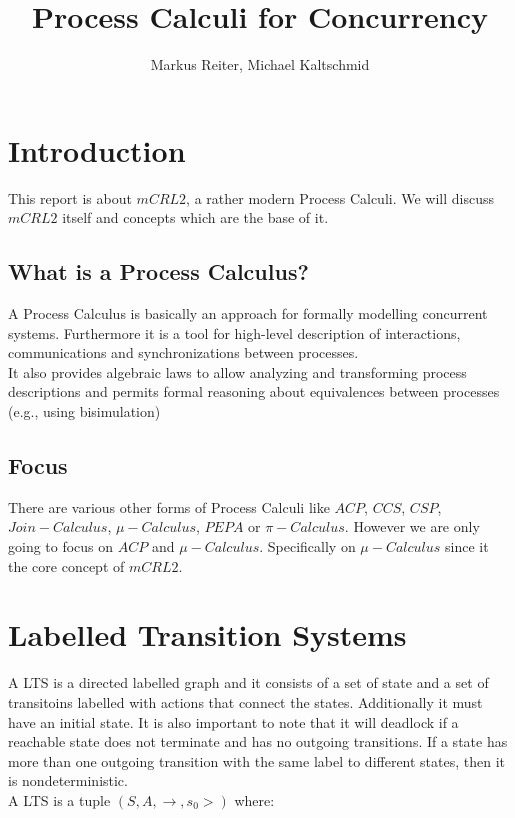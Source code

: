 \documentclass{clseminar}
\title{Process Calculi for Concurrency}
\author{Markus Reiter, Michael Kaltschmid}
\begin{document}
  \abstract{}
  \maketitle
  \tableofcontents

  \section{Introduction}
  This report is about $mCRL2$, a rather modern Process Calculi. We will discuss $mCRL2$ itself and concepts which are the base of it.
  \subsection{What is a Process Calculus?}
  A Process Calculus is basically an approach for formally modelling concurrent systems.
  Furthermore it is a tool for high-level description of interactions, communications and synchronizations between processes. \\
  It also provides algebraic laws to allow analyzing and transforming process descriptions and permits formal reasoning about equivalences between processes (e.g., using bisimulation) \\

  \subsection{Focus}
  There are various other forms of Process Calculi like $ACP$, $CCS$, $CSP$, $Join-Calculus$, $\mu-Calculus$, $PEPA$ or $\pi-Calculus$. However we are only going to focus on $ACP$ and $\mu-Calculus$. Specifically on $\mu-Calculus$ since it the core concept of $mCRL2$.

  \section{Labelled Transition Systems}
  A LTS is a directed labelled graph and it consists of a set of state and a set of transitoins labelled with actions that connect the states. Additionally it must have an initial state. It is also important to note that it will deadlock if a reachable state does not terminate and has no outgoing
  transitions. If a state has more than one outgoing transition with the same label to different states, then it is nondeterministic. \\[12pt]
  A LTS is a tuple $(S, A, \to,s_0>)$ where: \\
\end{document}
